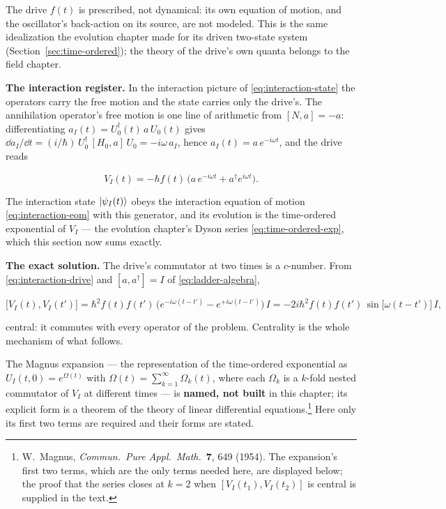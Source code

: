\begin{note}
The drive $f(t)$ is prescribed, not dynamical: its own equation of motion, and the oscillator's back-action on its source, are not modeled. This is the same idealization the evolution chapter made for its driven two-state system (Section~\ref{sec:time-ordered}); the theory of the drive's own quanta belongs to the field chapter.
\end{note}

\medskip\noindent\textbf{The interaction register.} In the interaction picture of \eqref{eq:interaction-state} the operators carry the free motion and the state carries only the drive's. The annihilation operator's free motion is one line of arithmetic from $[N, a] = -a$: differentiating $a_I(t) = U_0^\dagger(t)\,a\,U_0(t)$ gives $\dd a_I/\dd t = (i/\hbar)\,U_0^\dagger\,[H_0, a]\,U_0 = -i\omega\,a_I$, hence $a_I(t) = a\,e^{-i\omega t}$, and the drive reads
\begin{linenomath}
    \begin{equation}
        V_I(t) = -\hbar f(t)\,\bigl(a\,e^{-i\omega t} + a^\dagger e^{i\omega t}\bigr) .
        \label{eq:interaction-drive}
    \end{equation}
\end{linenomath}
The interaction state $\ket{\psi_I(t)}$ obeys the interaction equation of motion \eqref{eq:interaction-eom} with this generator, and its evolution is the time-ordered exponential of $V_I$ --- the evolution chapter's Dyson series \eqref{eq:time-ordered-exp}, which this section now sums exactly.

\medskip\noindent\textbf{The exact solution.} The drive's commutator at two times is a $c$-number. From \eqref{eq:interaction-drive} and $[a, a^\dagger] = I$ of \eqref{eq:ladder-algebra},
\begin{linenomath}
    \begin{equation}
        \bigl[V_I(t), V_I(t')\bigr]
        = \hbar^2 f(t)f(t')\,\bigl(e^{-i\omega(t-t')} - e^{+i\omega(t-t')}\bigr)\,I
        = -2i\hbar^2 f(t)f(t')\,\sin\bigl[\omega(t-t')\bigr]\,I ,
        \label{eq:drive-commutator}
    \end{equation}
\end{linenomath}
central: it commutes with every operator of the problem. Centrality is the whole mechanism of what follows.

\begin{note}
The Magnus expansion --- the representation of the time-ordered exponential as $U_I(t,0)=e^{\Omega(t)}$ with $\Omega(t)=\sum_{k=1}^{\infty}\Omega_k(t)$, where each $\Omega_k$ is a $k$-fold nested commutator of $V_I$ at different times --- is \textbf{named, not built} in this chapter; its explicit form is a theorem of the theory of linear differential equations.\footnote{W.~Magnus, \emph{Commun.~Pure Appl.~Math.}~\textbf{7}, 649 (1954). The expansion's first two terms, which are the only terms needed here, are displayed below; the proof that the series closes at $k=2$ when $[V_I(t_1),V_I(t_2)]$ is central is supplied in the text.} Here only its first two terms are required and their forms are stated.
\end{note}

